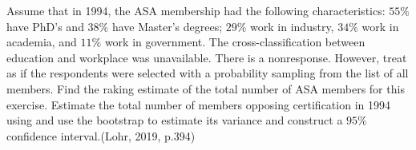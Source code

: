 \documentclass[12pt]{article}
\begin{document}
Assume that in 1994, the ASA membership had the following characteristics: $55\%$
have PhD’s and $38\%$ have Master’s degrees; $29\%$ work in industry, $34\%$ work in
academia, and $11\%$ work in government. The cross-classification between education
and workplace was unavailable. There is a nonresponse. However, treat as if the respondents were selected with a probability sampling from the list of all members. Find the raking estimate of the total number of ASA members for this exercise. Estimate the total number of members opposing certification in 1994 using and use the bootstrap to estimate its variance and construct a $95\%$ confidence interval.\hfill (Lohr, 2019, p.394)
\end{document}
